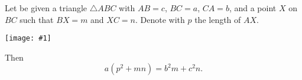 \documentclass[12pt]{article}
\newcommand{\figura}[1]{\begin{center}\texttt{[image: \#1]}\end{center}}
\begin{document}
Let be given a triangle $\triangle ABC$ with $AB=c$, $BC=a$, $CA=b$, and a point $X$ on $BC$ such that $BX=m$ and $XC=n$. Denote with $p$ the length of $AX$.
\figura{stewart}
Then $$a(p^2+mn)=b^2m+c^2n.$$
\end{document}
